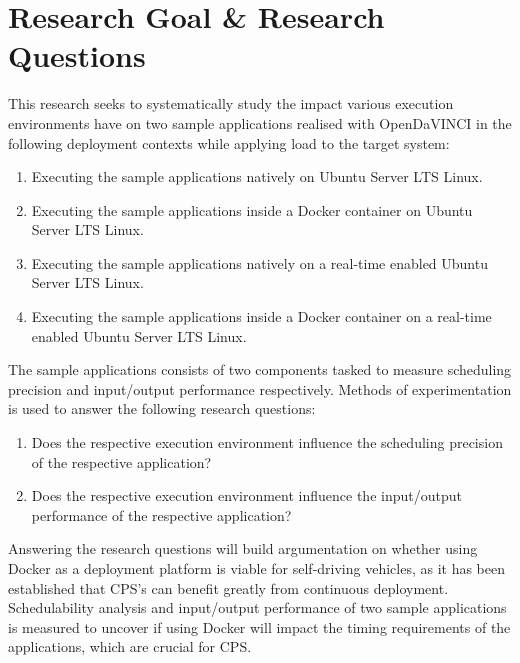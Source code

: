\section{Research Goal \& Research Questions}

This research seeks to systematically study the impact various execution environments have on two sample applications realised with OpenDaVINCI in the following deployment contexts while applying load to the target system:\\ 

\begin{enumerate}
\item Executing the sample applications natively on Ubuntu Server LTS Linux.
\item Executing the sample applications inside a Docker container on Ubuntu Server LTS Linux.
\item Executing the sample applications natively on a real-time enabled Ubuntu Server LTS Linux.
\item Executing the sample applications inside a Docker container on a real-time enabled Ubuntu Server LTS Linux.\\
\end{enumerate}

The sample applications consists of two components tasked to measure scheduling precision and input/output performance respectively. 
Methods of experimentation is used to answer the following research questions:\\
\begin{enumerate}[label=\textbf{RQ\arabic*}]
\label{section:rqs}
	\item Does the respective execution environment influence the scheduling precision of the respective application?
	\item Does the respective execution environment influence the input/output performance of the respective application?\\
\end{enumerate}

Answering the research questions will build argumentation on whether using Docker as a deployment platform is viable for self-driving vehicles, as it has been established that CPS's can benefit greatly from continuous deployment. Schedulability analysis and input/output performance of two sample applications is measured to uncover if using Docker will impact the timing requirements of the applications, which are crucial for CPS.



